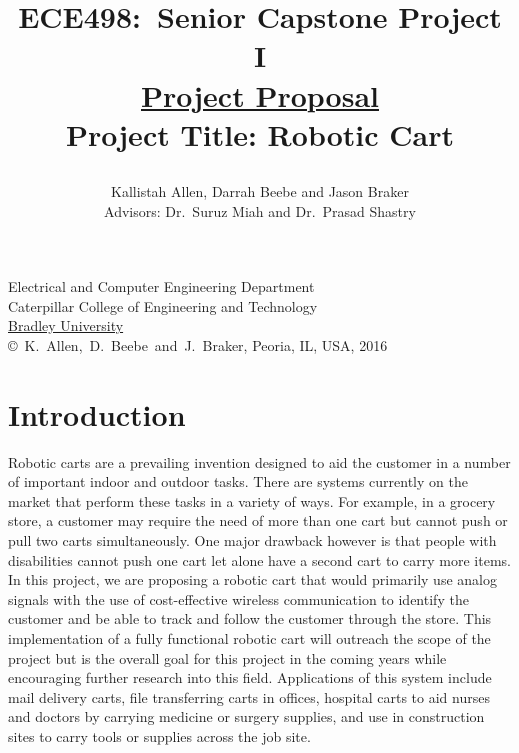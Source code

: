 \documentclass[letterpaper,12pt]{article}   %
\title{ECE498:~Senior Capstone Project I\\\textbf{\underline{Project Proposal}}\\
\vspace{0.5in}
Project Title: Robotic Cart
\vspace{1.0in}
\author{Kallistah Allen, Darrah Beebe and Jason Braker\\ Advisors: Dr.~Suruz Miah and Dr.~Prasad Shastry}
}
\date{}  %
\begin{document}
\begin{titlepage}
 \maketitle

\vspace*{4.0cm}
\begin{center}
\normalsize
Electrical and Computer Engineering Department\\
Caterpillar College of Engineering and Technology\\
\href{http://www.bradley.edu/}{Bradley University}\\

\vspace*{6.0cm}
\copyright~K.~Allen,~D.~Beebe~and~J.~Braker, Peoria, IL, USA, 2016\\

\end{center}
\thispagestyle{empty}

\end{titlepage} 
\newpage
\renewcommand{\contentsname}{Table of Contents}
\tableofcontents
\newpage

\section{Introduction} %


Robotic carts are a prevailing invention designed to aid the customer in a number of important indoor and outdoor tasks. There are systems currently on the market that perform these tasks in a variety of ways. For example, in a grocery store, a customer may require the need of more than one cart but cannot push or pull two carts simultaneously. One major drawback however is that people with disabilities cannot push one cart let alone have a second cart to carry more items. In this project, we are proposing a robotic cart that would primarily use analog signals with the use of cost-effective wireless communication to identify the customer and be able to track and follow the customer through the store. This implementation of a fully functional robotic cart will outreach the scope of the project but is the overall goal for this project in the coming years while encouraging further research into this field. Applications of this system include mail delivery carts, file transferring carts in offices, hospital carts to aid nurses and doctors by carrying medicine or surgery supplies, and use in construction sites to carry tools or supplies across the job site.
\end{document}
